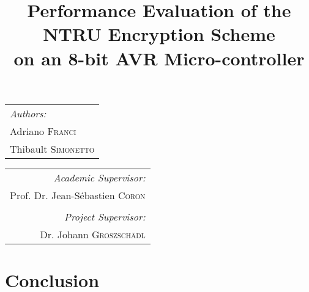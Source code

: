 \documentclass[11pt,a4paper]{article}
\begin{document}
\title{Performance Evaluation of the NTRU Encryption Scheme\\ on an 8-bit AVR 
Micro-controller}
\maketitle

\begin{tabular}[t]{@{}l} 
	\textit{Authors:}\\
	Adriano \textsc{Franci}\\
	Thibault \textsc{Simonetto}\\
\end{tabular}
\hfill
\begin{tabular}[t]{r@{}}
	\textit{Academic Supervisor:}\\
	Prof. Dr. Jean-S\'ebastien \textsc{Coron}\\
	\vspace{1em}\\
	\textit{Project Supervisor:}\\
	Dr. Johann \textsc{Groszsch\"adl}\\
\end{tabular}










\section{Conclusion}




\end{document}
